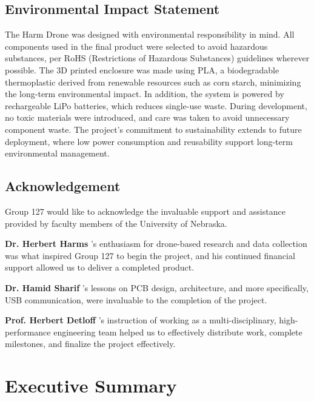 \documentclass[12pt]{article}
\makeatletter
\newcommand\teenyparagraph[1]{%
  \@tempswatrue
  \if@nobreak\@tempswafalse\fi
  \if@noskipsec \leavevmode \fi
  \par
  \@nobreakfalse
  \everypar{}%
  \protected@edef\@svsec{\@seccntformat{paragraph}}%
  \@tempswafalse
  \@xsect{3.25ex \@plus 1ex \@minus .2ex}%
  {\normalfont\normalsize\bfseries #1}%
}
\makeatother
\begin{document}
\subsection*{Environmental Impact Statement}
The Harm Drone was designed with environmental responsibility in mind. All components used in the final product were selected to avoid hazardous substances, per RoHS (Restrictions of Hazardous Substances) guidelines wherever possible. The 3D printed enclosure was made using PLA, a biodegradable thermoplastic derived from renewable resources such as corn starch, minimizing the long-term environmental impact. In addition, the system is powered by rechargeable LiPo batteries, which reduces single-use waste. During development, no toxic materials were introduced, and care was taken to avoid unnecessary component waste. The project’s commitment to sustainability extends to future deployment, where low power consumption and reusability support long-term environmental management.



\subsection*{Acknowledgement}

Group 127 would like to acknowledge the invaluable support and assistance provided by faculty members of the University of Nebraska.
\teenyparagraph{Dr. Herbert Harms}'s enthusiasm for drone-based research and data collection was what inspired Group 127 to begin the project, and his continued financial support allowed us to deliver a completed product.
\teenyparagraph{Dr. Hamid Sharif}'s lessons on PCB design, architecture, and more specifically, USB communication, were invaluable to the completion of the project.
\teenyparagraph{Prof. Herbert Detloff}'s instruction  of working as a multi-disciplinary, high-performance engineering team helped us to effectively distribute work, complete milestones, and finalize the project effectively.

\newpage
\section*{Executive Summary}
\end{document}
